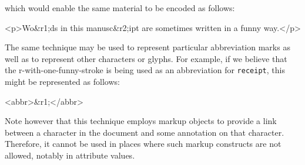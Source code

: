 \par\egroup 
 which would enable the same material to be encoded as follows: \par\hfill\bgroup\exampleFont\vskip 10pt\begin{shaded}
\obeyspaces <p>Wo\&r1;ds in this manusc\&r2;ipt are\newline
  sometimes written in a funny way.</p> \end{shaded}
\par\egroup 
\par
The same technique may be used to represent particular abbreviation marks as well as to represent other characters or glyphs. For example, if we believe that the r-with-one-funny-stroke is being used as an abbreviation for \texttt{receipt}, this might be represented as follows:\par\hfill\bgroup\exampleFont\vskip 10pt\begin{shaded}
\obeyspaces <abbr>\&r1;</abbr>\end{shaded}
\par\egroup 
\par
Note however that this technique employs markup objects to provide a link between a character in the document and some annotation on that character. Therefore, it cannot be used in places where such markup constructs are not allowed, notably in attribute values. \par
